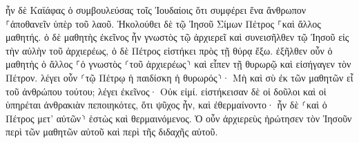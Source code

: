 \documentclass{openreader}
\begin{document}
ἦν δὲ Καϊάφας ὁ συμβουλεύσας τοῖς Ἰουδαίοις ὅτι συμφέρει ἕνα ἄνθρωπον ⸀ἀποθανεῖν ὑπὲρ τοῦ λαοῦ. 
Ἠκολούθει δὲ τῷ Ἰησοῦ Σίμων Πέτρος ⸀καὶ ἄλλος μαθητής. ὁ δὲ μαθητὴς ἐκεῖνος ἦν γνωστὸς τῷ ἀρχιερεῖ καὶ συνεισῆλθεν τῷ Ἰησοῦ εἰς τὴν αὐλὴν τοῦ ἀρχιερέως, 
ὁ δὲ Πέτρος εἱστήκει πρὸς τῇ θύρᾳ ἔξω. ἐξῆλθεν οὖν ὁ μαθητὴς ὁ ἄλλος ⸀ὁ γνωστὸς ⸂τοῦ ἀρχιερέως⸃ καὶ εἶπεν τῇ θυρωρῷ καὶ εἰσήγαγεν τὸν Πέτρον. 
λέγει οὖν ⸂τῷ Πέτρῳ ἡ παιδίσκη ἡ θυρωρός⸃· Μὴ καὶ σὺ ἐκ τῶν μαθητῶν εἶ τοῦ ἀνθρώπου τούτου; λέγει ἐκεῖνος· Οὐκ εἰμί. 
εἱστήκεισαν δὲ οἱ δοῦλοι καὶ οἱ ὑπηρέται ἀνθρακιὰν πεποιηκότες, ὅτι ψῦχος ἦν, καὶ ἐθερμαίνοντο· ἦν δὲ ⸂καὶ ὁ Πέτρος μετ’ αὐτῶν⸃ ἑστὼς καὶ θερμαινόμενος. 
Ὁ οὖν ἀρχιερεὺς ἠρώτησεν τὸν Ἰησοῦν περὶ τῶν μαθητῶν αὐτοῦ καὶ περὶ τῆς διδαχῆς αὐτοῦ. 
\end{document}
